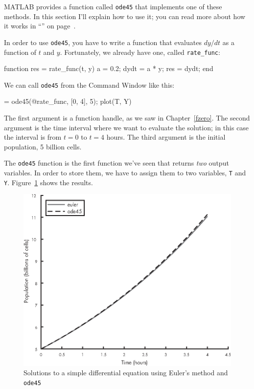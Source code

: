 
MATLAB provides a function called \lstinline{ode45} that implements one of these methods.  In this section I'll explain how to use it; you can read more about how it works in ``'' on page~\pageref{howode45}.


In order to use \lstinline{ode45}, you have to write a function that evaluates $dy/dt$ as a function of $t$ and $y$.  Fortunately, we already have one, called \lstinline{rate_func}:

\begin{code}
function res = rate_func(t, y)
   a = 0.2;
   dydt = a * y;
   res = dydt;
end
\end{code}

We can call \lstinline{ode45} from the Command Window like this:

\begin{code}
[T, Y] = ode45(@rate_func, [0, 4], 5);
plot(T, Y)
\end{code}

The first argument is a function handle, as we saw in Chapter~\ref{fzero}.  The second argument is the time interval where we want to evaluate the solution; in this case the interval is from $t=0$ to $t=4$ hours.  The third argument is the initial population, 5 billion cells.


The \lstinline{ode45} function is the first function we've seen that returns \emph{two} output variables.
In order to store them, we have to assign them to two variables, \lstinline{T} and \lstinline{Y}. Figure~\ref{fig:runge} shows the results.

\begin{figure}[ht]
\includegraphics{images/figure09_02_new.eps}
\caption{Solutions to a simple differential equation using Euler's method and \lstinline{ode45}}
\label{fig:runge}
\end{figure}

